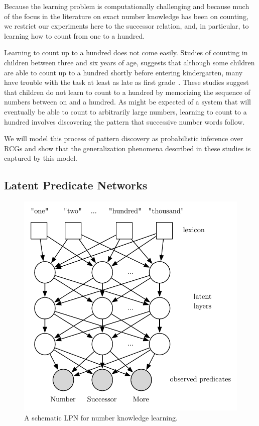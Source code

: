 \documentclass[10pt,letterpaper]{article}
\begin{document}
Because the learning problem is computationally challenging and
because much of the focus in the literature on exact number knowledge
has been on counting, we restrict our experiments here to the
successor relation, and, in particular, to learning how to count from
one to a hundred.

Learning to count up to a hundred does not come easily. Studies of
counting in children between three and six years of age, suggests that
although some children are able to count up to a hundred shortly
before entering kindergarten, many have trouble with the task at least
as late as first
grade~\cite{FusRicBriar1982,miller1987counting}. These studies suggest
that children do not learn to count to a hundred by memorizing the
sequence of numbers between on and a hundred. As might be expected of
a system that will eventually be able to count to arbitrarily large
numbers, learning to count to a hundred involves discovering the
pattern that successive number words follow. 

We will model this process of pattern discovery as probabilistic
inference over RCGs and show that the generalization phenomena
described in these studies is captured by this model. 

\subsection{Latent Predicate Networks}

\begin{figure}[t]
\includegraphics[width=0.9\linewidth]{figures/lpn}
\caption{A schematic LPN for number knowledge learning.}
\end{figure}
\end{document}

